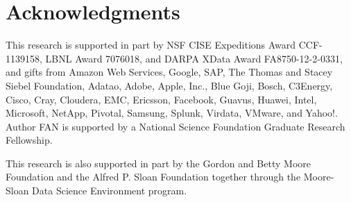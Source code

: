 \documentclass[10pt, conference, compsocconf]{IEEEtran}
\begin{document}
\section{Acknowledgments}

This research is supported in part by NSF CISE Expeditions Award CCF-1139158, LBNL Award 7076018, and DARPA XData Award FA8750-12-2-0331, and gifts from Amazon Web Services, Google, SAP,  The Thomas and Stacey Siebel Foundation, Adatao, Adobe, Apple, Inc., Blue Goji, Bosch, C3Energy, Cisco, Cray, Cloudera, EMC, Ericsson, Facebook, Guavus, Huawei, Intel, Microsoft, NetApp, Pivotal, Samsung, Splunk, Virdata, VMware, and Yahoo!. Author FAN is supported by a National Science Foundation Graduate Research Fellowship.

This research is also supported in part by the Gordon and Betty Moore
Foundation and the Alfred P. Sloan Foundation together through the
Moore-Sloan Data Science Environment program.
%

%
%




\end{document}
